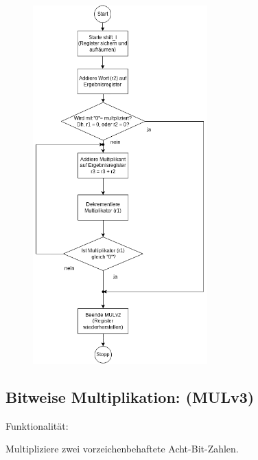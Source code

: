 \documentclass[fleqn, a4paper, 11pt]{article}       %
\begin{document}
\begin{figure}[h]
    \centering
    \includegraphics[width =0.6\textwidth]{Mulv2.png}
\end{figure}

\newpage

\subsection{Bitweise Multiplikation: (MULv3)\label{A.MULv3}}
Funktionalität:

Multipliziere zwei vorzeichenbehaftete Acht-Bit-Zahlen.
\\
\end{document}
